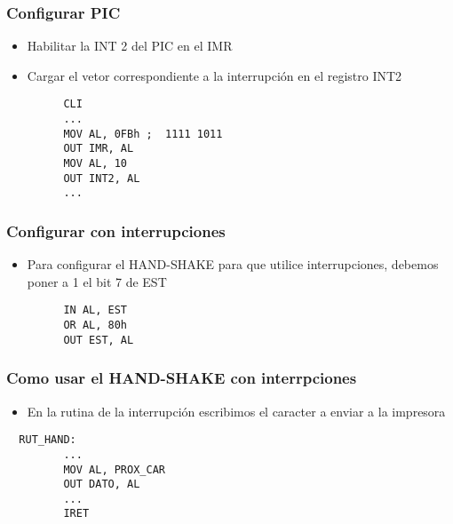 \documentclass{beamer}
\begin{document}
\begin{frame}[fragile]
\frametitle{Configurar PIC}
\begin{itemize}
 \item Habilitar la INT 2 del PIC en el IMR
 \item Cargar el vetor correspondiente a la interrupción en el registro INT2
\end{itemize}
\begin{block}{}
 \begin{verbatim}
         CLI
         ...
         MOV AL, 0FBh ;  1111 1011
         OUT IMR, AL
         MOV AL, 10
         OUT INT2, AL
         ...
 \end{verbatim}
\end{block}
\end{frame}

\begin{frame}[fragile]
\frametitle{Configurar con interrupciones}
\begin{itemize}
 \item Para configurar el HAND-SHAKE para que utilice interrupciones, debemos poner a 1 el bit 7 de EST
\end{itemize}
\begin{block}{}
 \begin{verbatim}
         IN AL, EST
         OR AL, 80h
         OUT EST, AL
 \end{verbatim}
\end{block}
\end{frame}

\begin{frame}[fragile]
\frametitle{Como usar el HAND-SHAKE con interrpciones}
\begin{itemize}
 \item En la rutina de la interrupción escribimos el caracter a enviar a la impresora
\end{itemize}
\begin{block}{}
 \begin{verbatim}
  RUT_HAND:
         ...
         MOV AL, PROX_CAR
         OUT DATO, AL
         ...
         IRET
 \end{verbatim}
\end{block}
\end{frame}
\end{document}
